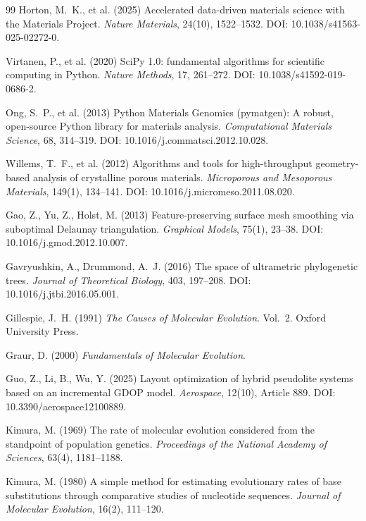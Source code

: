 \documentclass[11pt]{article}
\begin{document}
\begin{thebibliography}{99}
Horton, M.~K., et al. (2025)
Accelerated data-driven materials science with the Materials Project.
\emph{Nature Materials}, 24(10), 1522--1532.
DOI: 10.1038/s41563-025-02272-0.

Virtanen, P., et al. (2020)
SciPy 1.0: fundamental algorithms for scientific computing in Python.
\emph{Nature Methods}, 17, 261--272.
DOI: 10.1038/s41592-019-0686-2.

Ong, S.~P., et al. (2013)
Python Materials Genomics (pymatgen): A robust, open-source Python
library for materials analysis.
\emph{Computational Materials Science}, 68, 314--319.
DOI: 10.1016/j.commatsci.2012.10.028.

Willems, T.~F., et al. (2012)
Algorithms and tools for high-throughput geometry-based analysis of
crystalline porous materials.
\emph{Microporous and Mesoporous Materials}, 149(1), 134--141.
DOI: 10.1016/j.micromeso.2011.08.020.

Gao, Z., Yu, Z., Holst, M. (2013)
Feature-preserving surface mesh smoothing via suboptimal Delaunay
triangulation.
\emph{Graphical Models}, 75(1), 23--38.
DOI: 10.1016/j.gmod.2012.10.007.

Gavryushkin, A., Drummond, A.~J. (2016)
The space of ultrametric phylogenetic trees.
\emph{Journal of Theoretical Biology}, 403, 197--208.
DOI: 10.1016/j.jtbi.2016.05.001.

Gillespie, J.~H. (1991)
\emph{The Causes of Molecular Evolution}.
Vol.~2. Oxford University Press.

Graur, D. (2000)
\emph{Fundamentals of Molecular Evolution}.

Guo, Z., Li, B., Wu, Y. (2025)
Layout optimization of hybrid pseudolite systems based on an
incremental GDOP model.
\emph{Aerospace}, 12(10), Article 889.
DOI: 10.3390/aerospace12100889.

Kimura, M. (1969)
The rate of molecular evolution considered from the standpoint of
population genetics.
\emph{Proceedings of the National Academy of Sciences}, 63(4),
1181--1188.

Kimura, M. (1980)
A simple method for estimating evolutionary rates of base
substitutions through comparative studies of nucleotide sequences.
\emph{Journal of Molecular Evolution}, 16(2), 111--120.


\end{thebibliography}
\end{document}
